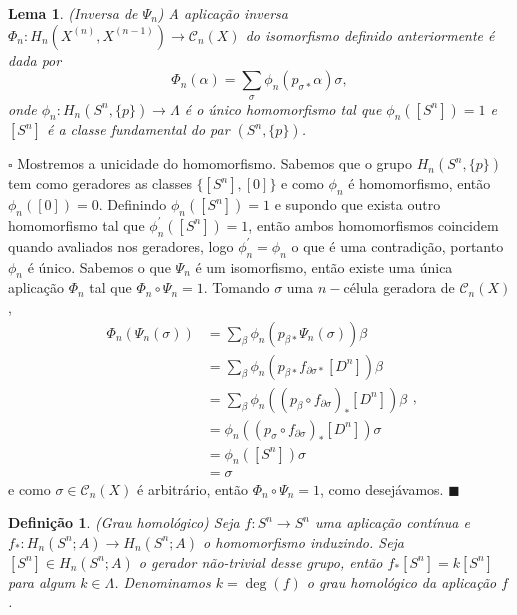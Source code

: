 \documentclass[12pt]{book}
\newtheorem{lema}[teorema]{Lema}
\newtheorem{definicao}[teorema]{Definição}
\newenvironment{prova}[1]{$\square$ #1}{\hfill$\blacksquare$}
\newcommand{\homologia}[2]{H_{#1}(#2;A)}
\newcommand{\homologiarel}[3]{H_{#1}(#2,#3)}
\newcommand{\homologiarelskelesimpl}[2]{H_{#1}(X^{(#2)}, X^{(#2-1)})}
\begin{document}
	\begin{lema}
		(Inversa de $\Psi_{n}$) A aplicação inversa $\Phi_{n} : \homologiarelskelesimpl{n}{n} \to \mathcal{C}_{n}(X)$ do isomorfismo definido anteriormente é dada por
		$$
		\Phi_{n}(\alpha) = \sum_{\sigma} \phi_{n}(p_{\sigma *}\alpha)\sigma,
		$$
		onde $\phi_{n}: \homologiarel{n}{S^{n}}{\{p\}} \to \Lambda$ é o único homomorfismo tal que $\phi_{n}([S^{n}])=1$ e $[S^{n}]$ é a classe fundamental do par $(S^{n}, \{p\})$.
	\end{lema}
	\begin{prova}
		Mostremos a unicidade do homomorfismo. Sabemos que o grupo $\homologiarel{n}{S^{n}}{\{p\}}$ tem como geradores as classes $\{[S^{n}], [0]\}$ e como $\phi_{n}$ é homomorfismo, então $\phi_{n}([0]) = 0$. Definindo $\phi_{n}([S^{n}]) = 1$ e supondo que exista outro homomorfismo tal que $\phi_{n}^{'} ([S^{n}]) = 1$, então ambos homomorfismos coincidem quando avaliados nos geradores, logo $\phi_{n}^{'}=\phi_{n}$ o que é uma contradição, portanto $\phi_{n}$ é único. Sabemos o que $\Psi_{n}$ é um isomorfismo, então existe uma única aplicação $\Phi_{n}$ tal que $\Phi_{n} \circ \Psi_{n} = 1$. Tomando $\sigma$ uma $n-$célula geradora de $\mathcal{C}_{n}(X)$,
		$$
		\begin{aligned}
		\Phi_{n}(\Psi_{n}(\sigma)) 
		&= \sum_{\beta}\phi_{n}(p_{\beta *}\Psi_{n}(\sigma))\beta
		\\
		&= \sum_{\beta}\phi_{n}(p_{\beta *}f_{\partial\sigma *}[D^{n}])\beta
		\\
		&= \sum_{\beta}\phi_{n}((p_{\beta}\circ f_{\partial\sigma})_{*}[D^{n}])\beta
		\\
		&= \phi_{n}((p_{\sigma}\circ f_{\partial\sigma})_{*}[D^{n}])\sigma
		\\
		&= \phi_{n}([S^{n}])\sigma
		\\
		&= \sigma	
		\end{aligned},
		$$
		e como $\sigma \in \mathcal{C}_{n}(X)$ é arbitrário, então $\Phi_{n} \circ \Psi_{n} = 1$, como desejávamos.
	\end{prova}
	
	\begin{definicao}
		(Grau homológico) Seja $f: S^{n} \to S^{n}$ uma aplicação contínua e $f_{*}: \homologia{n}{S^{n}} \to \homologia{n}{S^{n}}$ o homomorfismo induzindo. Seja $[S^{n}] \in \homologia{n}{S^{n}}$ o gerador não-trivial desse grupo, então $f_{*}[S^{n}] = k[S^{n}]$ para algum $k \in \Lambda$. Denominamos $k=\deg(f)$ o grau homológico da aplicação $f$.
	\end{definicao}
	
\end{document}
